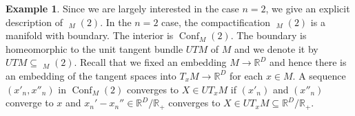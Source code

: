 \documentclass{scrartcl}
\theoremstyle{plain}
\theoremstyle{definition}
\newtheorem{example}[theorem]{Example}
\newcommand{\R}{\mathbb R}
\renewcommand{\subset}{\subseteq}
\DeclareMathOperator{\Conf}{Conf}
\DeclareMathOperator{\cConf}{\overline{Conf}}
\begin{document}
\begin{example}\label{ex:conf-2}
    Since we are largely interested in the case $n=2$, we give an explicit description of $\cConf_M(2)$. In the $n=2$ case, the compactification $\cConf_M(2)$ is a manifold with boundary. The interior is $\Conf_M(2)$. The boundary is homeomorphic to the unit tangent bundle $UTM$ of $M$ and we denote it by  $UTM\subset\cConf_M(2)$. Recall that we fixed an embedding $M\to \R^D$ and hence there is an embedding of the tangent spaces into $T_xM\to\R^D$ for each $x\in M$. A sequence $(x'_n, x''_n)$ in $\Conf_M(2)$ converges to $X\in UT_xM$ if $(x'_n)$ and $(x''_n)$ converge to $x$ and $x_n'-x_n''\in \R^D/ \R_+$ converges to $X\in UT_xM\subset\R^D/\R_+$. 
\end{example}



\end{document}
